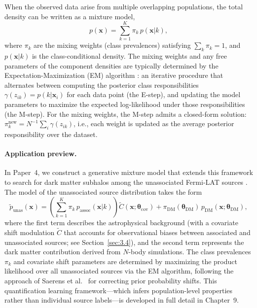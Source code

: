 When the observed data arise from multiple overlapping populations, the total density can be written as a mixture model,
\begin{equation}
p(\mathbf{x}) = \sum_{k=1}^{K} \pi_k \, p(\mathbf{x}|k),
\label{eq:mixture_model}
\end{equation}
where $\pi_k$ are the mixing weights (class prevalences) satisfying $\sum_k \pi_k = 1$, and $p(\mathbf{x}|k)$ is the class-conditional density. The mixing weights and any free parameters of the component densities are typically determined by the Expectation-Maximization (EM) algorithm \cite{Dempster:1977}: an iterative procedure that alternates between computing the posterior class responsibilities $\gamma(z_{ik}) = p(k | \mathbf{x}_i)$ for each data point (the E-step), and updating the model parameters to maximize the expected log-likelihood under those responsibilities (the M-step). For the mixing weights, the M-step admits a closed-form solution: $\pi_k^\mathrm{new} = N^{-1}\sum_i \gamma(z_{ik})$, i.e., each weight is updated as the average posterior responsibility over the dataset.

\paragraph{Application preview.}

In Paper~4, we construct a generative mixture model that extends this framework to search for dark matter subhalos among the unassociated Fermi-LAT sources \cite{Amerio:2025sub}. The model of the unassociated source distribution takes the form
\begin{equation}
\tilde{p}_\mathrm{unas}(\mathbf{x}) = \left(\sum_{k=1}^{K} \pi_k\, p_\mathrm{assoc}(\mathbf{x}|k)\right) \tilde{C}(\mathbf{x};\boldsymbol{\theta}_\mathrm{cov}) + \pi_\mathrm{DM}(\boldsymbol{\theta}_\mathrm{DM})\, p_\mathrm{DM}(\mathbf{x};\boldsymbol{\theta}_\mathrm{DM}),
\label{eq:mixture_unas}
\end{equation}
where the first term describes the astrophysical background (with a covariate shift modulation $\tilde{C}$ that accounts for observational biases between associated and unassociated sources; see Section~\ref{sec:3.4}), and the second term represents the dark matter contribution derived from $N$-body simulations. The class prevalences $\pi_k$ and covariate shift parameters are determined by maximizing the product likelihood over all unassociated sources via the EM algorithm, following the approach of Saerens et al.~\cite{10.1162/089976602753284446_Saerens} for correcting prior probability shifts. This quantification learning framework---which infers population-level properties rather than individual source labels---is developed in full detail in Chapter~9.
